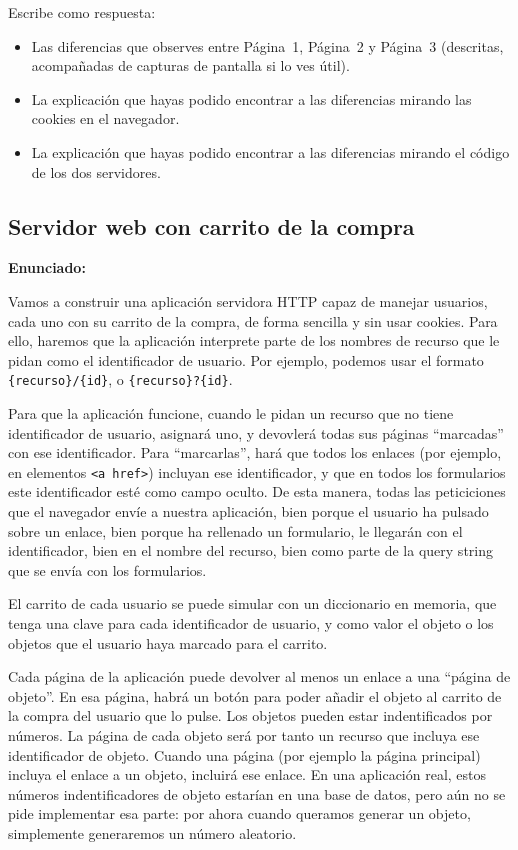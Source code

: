 Escribe como respuesta:

\begin{itemize}
\item Las diferencias que observes entre Página~1, Página~2 y Página~3 (descritas, acompañadas de capturas de pantalla si lo ves útil).
\item La explicación que hayas podido encontrar a las diferencias mirando las cookies en el navegador.
\item La explicación que hayas podido encontrar a las diferencias mirando el código de los dos servidores.  
\end{itemize}

\subsection{Servidor web con carrito de la compra}
\label{subsec:servidor-carrito}

\textbf{Enunciado:}

Vamos a construir una aplicación servidora HTTP capaz de manejar usuarios, cada uno con su carrito de la compra, de forma sencilla y sin usar cookies. Para ello, haremos que la aplicación interprete parte de los nombres de recurso que le pidan como el identificador de usuario. Por ejemplo, podemos usar el formato \verb|{recurso}/{id}|, o \verb|{recurso}?{id}|.

Para que la aplicación funcione, cuando le pidan un recurso que no tiene identificador de usuario, asignará uno, y devovlerá todas sus páginas ``marcadas'' con ese identificador. Para ``marcarlas'', hará que todos los enlaces (por ejemplo, en elementos \verb|<a href>|) incluyan ese identificador, y que en todos los formularios este identificador esté como campo oculto. De esta manera, todas las peticiciones que el navegador envíe a nuestra aplicación, bien porque el usuario ha pulsado sobre un enlace, bien porque ha rellenado un formulario, le llegarán con el identificador, bien en el nombre del recurso, bien como parte de la query string que se envía con los formularios.

El carrito de cada usuario se puede simular con un diccionario en memoria, que tenga una clave para cada identificador de usuario, y como valor el objeto o los objetos que el usuario haya marcado para el carrito.

Cada página de la aplicación puede devolver al menos un enlace a una ``página de objeto''. En esa página, habrá un botón para poder añadir el objeto al carrito de la compra del usuario que lo pulse. Los objetos pueden estar indentificados por números. La página de cada objeto será por tanto un recurso que incluya ese identificador de objeto. Cuando una página (por ejemplo la página principal) incluya el enlace a un objeto, incluirá ese enlace. En una aplicación real, estos números indentificadores de objeto estarían en una base de datos, pero aún no se pide implementar esa parte: por ahora cuando queramos generar un objeto, simplemente generaremos un número aleatorio.

